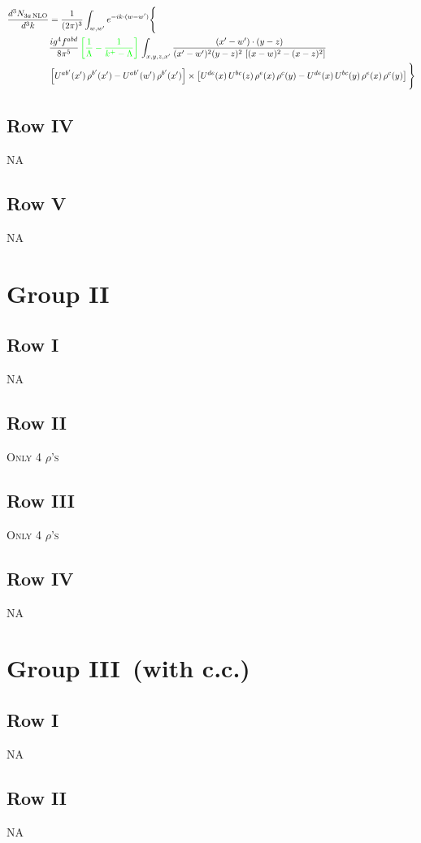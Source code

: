 \documentclass[9pt]{article}
\numberwithin{equation}{section}
\begin{document}
\begin{align}
\frac{d^{3}N_{3a\,\rm NLO}}{d^{3}k} & =\frac{1}{(2\pi)^{3}}\int_{w,w'}e^{-ik\cdot(w-w')}\Bigg\{\notag \\ & \frac{ig^{4}f^{abd}}{8\pi^{5}}\,{\color{green}\left[\frac{1}{\Lambda}-\frac{1}{k^{+}-\Lambda}\right]}\,\int_{x,y,z,x'}
\frac{(x'-w')\cdot(y-z)}{(x'-w')^{2}(y-z)^{2}\,\left[(x-w)^{2}-(x-z)^{2}\right]}\notag \\ & \left[U^{ab'}(x')\,\rho^{b'}(x')-U^{ab'}(w')\, \rho^{b'}(x')\right]\times \left[U^{de}(x)\,U^{bc}(z)\, \rho^{e}(x)\,\rho^{c}(y)-U^{de}(x)\,U^{bc}(y)\,\rho^{e}(x)\,\rho^{c}(y)\right]\Bigg\}
\end{align}
\subsection{Row IV}
\textsc{NA}
\subsection{Row V}
\textsc{NA}
\section{Group II}
\subsection{Row I}
\textsc{NA}
\subsection{Row II}
\textsc{Only 4 $\rho$'s}
\subsection{Row III}
\textsc{Only 4 $\rho$'s}
\subsection{Row IV}
\textsc{NA} 
\section{Group III\, (with c.c.)}
\subsection{Row I}
\textsc{NA}
\subsection{Row II}
\textsc{NA}
\end{document}
